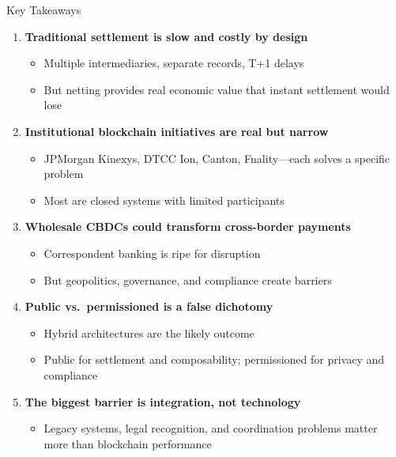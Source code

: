 \documentclass[10pt]{beamer}
\begin{document}
\begin{frame}{Key Takeaways}
  \begin{enumerate}
    \item \textbf{Traditional settlement is slow and costly by design}
    \begin{itemize}
      \item Multiple intermediaries, separate records, T+1 delays
      \item But netting provides real economic value that instant settlement would lose
    \end{itemize}
    
    \vspace{0.3em}
    \item \textbf{Institutional blockchain initiatives are real but narrow}
    \begin{itemize}
      \item JPMorgan Kinexys, DTCC Ion, Canton, Fnality---each solves a specific problem
      \item Most are closed systems with limited participants
    \end{itemize}
    
    \vspace{0.3em}
    \item \textbf{Wholesale CBDCs could transform cross-border payments}
    \begin{itemize}
      \item Correspondent banking is ripe for disruption
      \item But geopolitics, governance, and compliance create barriers
    \end{itemize}
    
    \vspace{0.3em}
    \item \textbf{Public vs.\ permissioned is a false dichotomy}
    \begin{itemize}
      \item Hybrid architectures are the likely outcome
      \item Public for settlement and composability; permissioned for privacy and compliance
    \end{itemize}
    
    \vspace{0.3em}
    \item \textbf{The biggest barrier is integration, not technology}
    \begin{itemize}
      \item Legacy systems, legal recognition, and coordination problems matter more than blockchain performance
    \end{itemize}
  \end{enumerate}
\end{frame}
\end{document}
